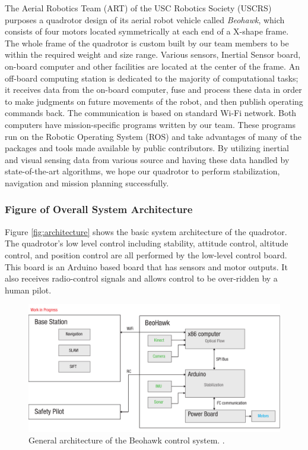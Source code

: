 \documentclass[12pt, letterpaper]{article}
\begin{document}
The Aerial Robotics Team (ART) of the USC Robotics Society (USCRS) purposes a quadrotor design of its aerial robot vehicle called \textit{Beohawk}, which consists of four motors located symmetrically at each end of a X-shape frame. The whole frame of the quadrotor is custom built by our team members to be within the required weight and size range. Various sensors, Inertial Sensor board, on-board computer and other facilities are located at the center of the frame. An off-board computing station is dedicated to the majority of computational tasks; it receives data from the on-board computer, fuse and process these data in order to make judgments on future movements of the robot, and then publish operating commands back. The communication is based on standard Wi-Fi network. Both computers have mission-specific programs written by our team. These programs run on the Robotic Operating System (ROS) and take advantages of many of the packages and tools made available by public contributors. By utilizing inertial and visual sensing data from various source and having these data handled by state-of-the-art algorithms, we hope our quadrotor to perform stabilization, navigation and mission planning successfully.

\subsubsection{Figure of Overall System Architecture}

Figure \eqref{fig:architecture} shows the basic system architecture of the quadrotor. The quadrotor's low level control including stability, attitude control, altitude control, and position control are all performed by the low-level control board. This board is an Arduino based board that has sensors and motor outputs. It also receives radio-control signals and allows control to be over-ridden by a human pilot.

\begin{figure}[h]
\centering
\includegraphics[width=14cm]{images/beohawk-system-arch.pdf}
\caption{General architecture of the Beohawk control system. .} 
\label{fig:architecture}
\end{figure}
\end{document}
